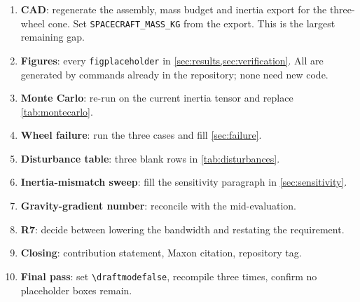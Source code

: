 \documentclass[conference,10pt,a4paper]{IEEEtran}
\newif\ifdraftmode
\begin{document}
\begin{enumerate}
\item \textbf{CAD}: regenerate the assembly, mass budget and inertia export for
the three-wheel cone. Set \texttt{SPACECRAFT\_MASS\_KG} from the export. This
is the largest remaining gap.
\item \textbf{Figures}: every \texttt{figplaceholder} in
\cref{sec:results,sec:verification}. All are generated by commands already in
the repository; none need new code.
\item \textbf{Monte Carlo}: re-run on the current inertia tensor and replace
\cref{tab:montecarlo}.
\item \textbf{Wheel failure}: run the three cases and fill \cref{sec:failure}.
\item \textbf{Disturbance table}: three blank rows in \cref{tab:disturbances}.
\item \textbf{Inertia-mismatch sweep}: fill the sensitivity paragraph in
\cref{sec:sensitivity}.
\item \textbf{Gravity-gradient number}: reconcile with the mid-evaluation.
\item \textbf{R7}: decide between lowering the bandwidth and restating the
requirement.
\item \textbf{Closing}: contribution statement, Maxon citation, repository tag.
\item \textbf{Final pass}: set \verb|\draftmodefalse|, recompile three times,
confirm no placeholder boxes remain.
\end{enumerate}
\end{document}
